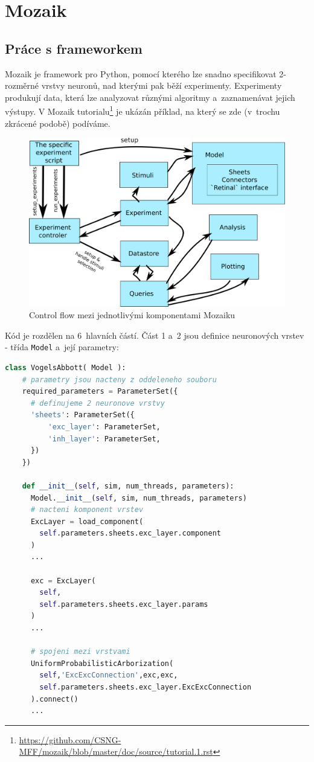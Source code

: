 \chapter{Mozaik}
\section{Práce s frameworkem}

Mozaik je framework pro Python, pomocí kterého lze snadno specifikovat 2-rozměrné vrstvy neuronů, nad kterými pak běží experimenty. Experimenty produkují data, která lze analyzovat různými algoritmy a~zaznamenávat jejich výstupy. V Mozaik tutorialu\footnote{\url{https://github.com/CSNG-MFF/mozaik/blob/master/doc/source/tutorial.1.rst}} je ukázán příklad, na který se zde (v~trochu zkrácené podobě) podíváme.

\begin{figure}
  \centering
  \includegraphics[width=.6\linewidth]{img/mozaik_control_flow.png}
  \caption{Control flow mezi jednotlivými komponentami Mozaiku\cite{MozaikIntroduction}}
\end{figure}

Kód je rozdělen na 6~hlavních částí. Část 1 a~2 jsou definice neuronových vrstev - třída \lstinline|Model| a~její parametry:

\begin{lstlisting}[language=Python]
  class VogelsAbbott( Model ):
    # parametry jsou nacteny z oddeleneho souboru
    required_parameters = ParameterSet({
      # definujeme 2 neuronove vrstvy
      'sheets': ParameterSet({
          'exc_layer': ParameterSet,
          'inh_layer': ParameterSet, 
      })
    })

    def __init__(self, sim, num_threads, parameters):
      Model.__init__(self, sim, num_threads, parameters)
      # nacteni komponent vrstev
      ExcLayer = load_component(
        self.parameters.sheets.exc_layer.component
      )
      ...
      
      exc = ExcLayer(
        self, 
        self.parameters.sheets.exc_layer.params
      )
      ...

      # spojeni mezi vrstvami
      UniformProbabilisticArborization(
        self,'ExcExcConnection',exc,exc,
        self.parameters.sheets.exc_layer.ExcExcConnection
      ).connect()
      ...
\end{lstlisting}


